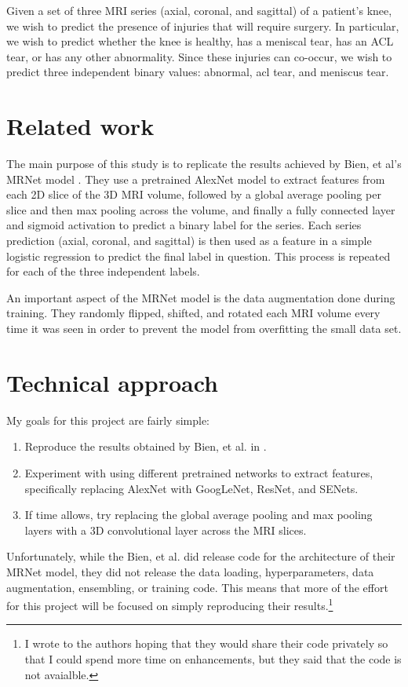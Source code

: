 \documentclass[10pt,twocolumn,letterpaper]{article}
\begin{document}
Given a set of three MRI series (axial, coronal, and sagittal) of a patient's
knee, we wish to predict the presence of injuries that will require surgery. In
particular, we wish to predict whether the knee is healthy, has a meniscal tear,
has an ACL tear, or has any other abnormality. Since these injuries can co-occur,
we wish to predict three independent binary values: abnormal, acl tear, and meniscus
tear.


\section{Related work}

The main purpose of this study is to replicate the results achieved by Bien, et
al's MRNet model \cite{bien2018deep}. They use a pretrained AlexNet \cite{krizhevsky2012imagenet}
model to extract features from each 2D slice of the 3D MRI volume, followed by
a global
average pooling per slice and then max pooling across the volume, and finally
a fully connected layer and sigmoid activation to predict a binary label for
the series. Each series prediction (axial, coronal, and sagittal) is then used
as a feature in a simple logistic regression to predict the final label in question.
This process is repeated for each of the three independent labels.

An important aspect of the MRNet model is the data augmentation done during training.
They randomly flipped, shifted, and rotated each MRI volume every time it was seen
in order to prevent the model from overfitting the small data set.


\section{Technical approach}

My goals for this project are fairly simple:
\begin{enumerate}
   \item Reproduce the results obtained by Bien, et al. in \cite{bien2018deep}.
   \item Experiment with using different pretrained networks to extract features,
   specifically replacing AlexNet with GoogLeNet, ResNet, and SENets.
   \item If time allows, try replacing the global average pooling and
   max pooling layers with a 3D convolutional layer across the MRI slices.
\end{enumerate}

Unfortunately, while the Bien, et al. did release code for the architecture of
their MRNet model, they did not release the data loading, hyperparameters, data
augmentation, ensembling, or training code.
This means that more of the effort for this project will be focused on simply
reproducing their results.\footnote{I wrote to the authors hoping that they
would share their code privately so that I could spend more time on enhancements,
but they said that the code is not avaialble.}
\end{document}
